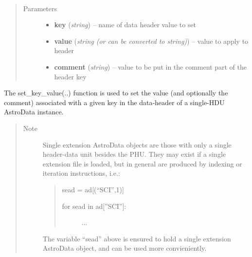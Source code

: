 \documentclass[letterpaper,10pt,english]{sphinxmanual}
\begin{document}

\begin{fulllineitems}
\label{chapter_AstroDataClass:astrodata.data.AstroData.set_key_value}~\begin{quote}\begin{description}
\item[{Parameters}] \leavevmode\begin{itemize}
\item {} 
\textbf{key} (\emph{string}) -- name of data header value to set

\item {} 
\textbf{value} (\emph{string (or can be converted to string)}) -- value to apply to header

\item {} 
\textbf{comment} (\emph{string}) -- value to be put in the comment part of the header key

\end{itemize}

\end{description}\end{quote}

The set\_key\_value(..) function is used to set the value (and optionally
the comment) associated
with a given key in the data-header of a single-HDU AstroData instance.
\begin{quote}\begin{description}
\item[{Note }] \leavevmode
Single extension AstroData objects are those with only a single
header-data unit besides the PHU.  They may exist if a single
extension file is loaded, but in general are produced by indexing or
iteration instructions, i.e.:
\begin{quote}

sead = ad{[}(``SCI'',1){]}
\begin{description}
\item[{for sead in ad{[}''SCI''{]}:}] \leavevmode
...

\end{description}
\end{quote}

The variable ``sead'' above is ensured to hold a single extension
AstroData object, and can be used more convieniently.

\end{description}\end{quote}

\end{fulllineitems}
\end{document}
